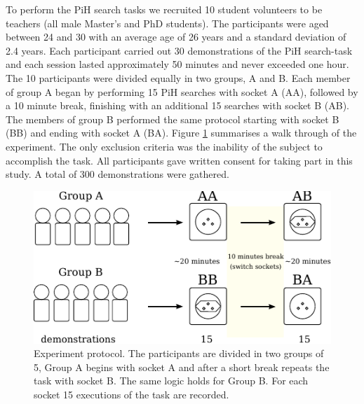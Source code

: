 \documentclass[final,5p,times,twocolumn]{elsarticle}
\begin{document}
To perform the PiH search tasks we recruited 10 student volunteers to be teachers (all male Master's and PhD students).
The participants were aged between 24 and 30 with an average age of 26 years and a standard deviation of 2.4 years.
Each participant carried out 30 demonstrations of the PiH search-task and each session lasted approximately 50 minutes and 
never exceeded one hour. The 10 participants were divided equally in two groups, A and B. Each member of group A began 
by performing 15 PiH searches with socket A (AA), followed by a 10 minute break, finishing with an additional 15 searches with socket B (AB). 
The members of group B performed the same protocol starting with socket B (BB) and ending with socket A (BA).
Figure \ref{fig:experiment_design} summarises a walk through of the experiment.
The only exclusion criteria was the inability of the subject to accomplish the task. All participants gave written consent 
for taking part in this study. A total of 300 demonstrations were gathered.

\begin{figure}[h]
\centering
 \includegraphics[width=0.9\linewidth]{./Figures/Fig/experiment_design_v2.pdf}
 \caption{Experiment protocol. The participants are divided in two groups of 5, Group A begins with socket A 
 and after a short break repeats the task with socket B. The same logic holds for Group B.
 For each socket 15 executions of the task are recorded.}
 \label{fig:experiment_design}
\end{figure}
\end{document}
